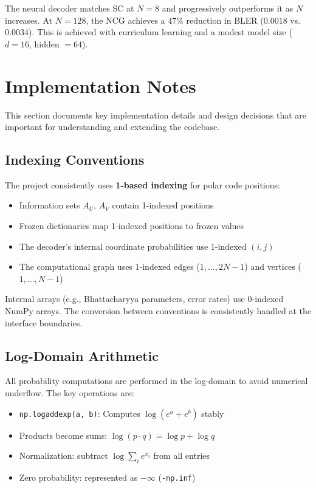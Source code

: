 \documentclass[11pt,a4paper]{article}
\begin{document}
The neural decoder matches SC at $N = 8$ and progressively outperforms it
as $N$ increases. At $N = 128$, the NCG achieves a $47\%$ reduction in
BLER ($0.0018$ vs.\ $0.0034$). This is achieved with curriculum learning
and a modest model size ($d = 16$, hidden $= 64$).


\section{Implementation Notes}
\label{sec:implementation}

This section documents key implementation details and design decisions that
are important for understanding and extending the codebase.

\subsection{Indexing Conventions}

The project consistently uses \textbf{1-based indexing} for polar code
positions:
\begin{itemize}
  \item Information sets $A_U$, $A_V$ contain 1-indexed positions
  \item Frozen dictionaries map 1-indexed positions to frozen values
  \item The decoder's internal coordinate probabilities use 1-indexed $(i, j)$
  \item The computational graph uses 1-indexed edges ($1, \ldots, 2N{-}1$)
        and vertices ($1, \ldots, N{-}1$)
\end{itemize}

Internal arrays (e.g., Bhattacharyya parameters, error rates) use 0-indexed
NumPy arrays. The conversion between conventions is consistently handled at
the interface boundaries.

\subsection{Log-Domain Arithmetic}

All probability computations are performed in the log-domain to avoid
numerical underflow. The key operations are:
\begin{itemize}
  \item \texttt{np.logaddexp(a, b)}: Computes $\log(e^a + e^b)$ stably
  \item Products become sums: $\log(p \cdot q) = \log p + \log q$
  \item Normalization: subtract $\log \sum_i e^{x_i}$ from all entries
  \item Zero probability: represented as $-\infty$ (\texttt{-np.inf})
\end{itemize}
\end{document}
